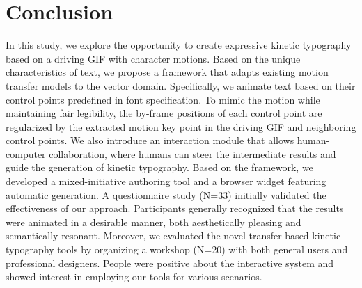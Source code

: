 \section{Conclusion}
In this study, we explore the opportunity to create expressive kinetic typography based on a driving GIF with character motions.
Based on the unique characteristics of text, we propose a framework that adapts existing motion transfer models to the vector domain.
Specifically, we animate text based on their control points predefined in font specification.
To mimic the motion while maintaining fair legibility, the by-frame positions of each control point are regularized by the extracted motion key point in the driving GIF and neighboring control points.
We also introduce an interaction module that allows human-computer collaboration, where humans can steer the intermediate results and guide the generation of kinetic typography.
Based on the framework, we developed a mixed-initiative authoring tool and a browser widget featuring automatic generation.
A questionnaire study (N=33) initially validated the effectiveness of our approach.
Participants generally recognized that the results were animated in a desirable manner, both aesthetically pleasing and semantically resonant.
Moreover, we evaluated the novel transfer-based kinetic typography tools by organizing a workshop (N=20) with both general users and professional designers.
People were positive about the interactive system and showed interest in employing our tools for various scenarios.


